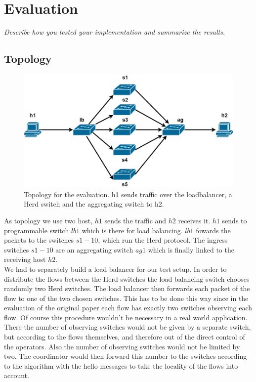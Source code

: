 \documentclass[11pt,oneside,a4paper]{article}
\newcommand{\hint}[1]{{\color{blue} \em #1}}
\begin{document}

\section{Evaluation}
\hint{Describe how you tested your implementation and summarize the results.} \\
\subsection{Topology} \label{topology}

\begin{figure}
	\centering
	\includegraphics[width=1\textwidth]{figures/Herd_topology}
	\caption{Topology for the evaluation. h1 sends traffic over the loadbalancer, a Herd switch and the aggregating switch to h2.}
	\label{fig:topology_fig}
\end{figure}

As topology we use two host, $h1$ sends the traffic and $h2$ receives it. $h1$ sends to programmable switch $lb1$ which is there for load balancing. $lb1$ fowards the packets to the switches $s1 - 10$, which run the Herd protocol. The ingress switches $s1 - 10$ are an aggregating switch $ag1$ which is finally linked to the receiving host $h2$.\\

We had to separately build a load balancer for our test setup. In order to distribute the flows between the Herd switches the load balancing switch chooses randomly two Herd switches. The load balancer then forwards each packet of the flow to one of the two chosen switches. This has to be done this way since in the evaluation of the original paper each flow has exactly two switches observing each flow. Of course this procedure wouldn't be necessary in a real world application. There the number of observing switches would not be given by a separate switch, but according to the flows themselves, and therefore out of the direct control of the operators. Also the number of observing switches would not be limited by two. The coordinator would then forward this number to the switches according to the algorithm with the hello messages to take the locality of the flows into account.
\end{document}
